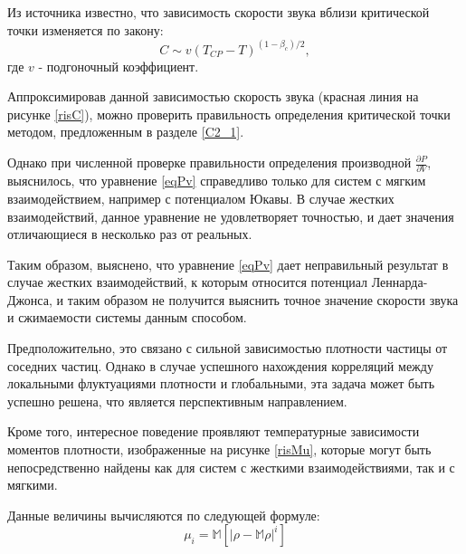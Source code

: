 Из источника \cite{soundSpeed} известно, что зависимость скорости звука вблизи критической точки изменяется по закону:
\begin{equation}
    C \sim v(T_{CP} - T)^{(1-\beta_c)/2},
    \label{eqFitC}
\end{equation}
где $v$ - подгоночный коэффициент.

Аппроксимировав данной зависимостью скорость звука (красная линия на рисунке \ref{risC}), можно проверить правильность определения критической точки методом, предложенным в разделе \ref{C2_1}.

Однако при численной проверке правильности определения производной $\frac{\partial P}{\partial V}$, выяснилось, что уравнение \ref{eqPv} справедливо только для систем с мягким взаимодействием, например с потенциалом Юкавы. В случае жестких взаимодействий, данное уравнение не удовлетворяет точностью, и дает значения отличающиеся в несколько раз от реальных.

Таким образом, выяснено, что уравнение \ref{eqPv} дает неправильный результат в случае жестких взаимодействий, к которым относится потенциал Леннарда-Джонса, и таким образом не получится выяснить точное значение скорости звука и сжимаемости системы данным способом.  

Предположительно, это связано с сильной зависимостью плотности частицы от соседних частиц. Однако в случае успешного нахождения корреляций между локальными флуктуациями плотности и глобальными, эта задача может быть успешно решена, что является перспективным направлением.  

Кроме того, интересное поведение проявляют температурные зависимости моментов плотности, изображенные на рисунке \ref{risMu}, которые могут быть непосредственно найдены как для систем с жесткими взаимодействиями, так и с мягкими. 

Данные величины вычисляются по следующей формуле:
\begin{equation}
\mu_i = \mathbb{M} \left[ |\rho - \mathbb{M} \rho|^i \right]
\label{eqMui}
\end{equation}

